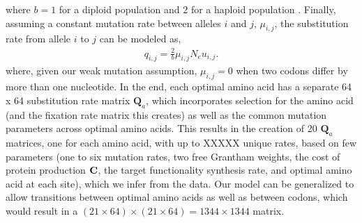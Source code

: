 \documentclass{article}
\newcommand{\Cost}{\ensuremath{\text{\textbf{C}}}\xspace}
\newcommand{\Ne}{\ensuremath{{N_e}}\xspace} %
\newcommand{\Qmatrix}{\mathbf{Q}\xspace}
\newcommand{\Qmatrixa}{\ensuremath{\Qmatrix_a}\xspace}
\newcommand{\muij}{\ensuremath{\mu_{i,j}}\xspace}
\begin{document}
where $b=1$ for a diploid population and $2$ for a haploid population \citep{Kimura1962,Wright1969,Iwasa1988,BergAndLassig2003,SellaAndHirsh2005}.
Finally, assuming a constant mutation rate between alleles $i$ and $j$, $\muij$, the substitution rate from allele $i$ to $j$ can be modeled as,
\begin{align*}
  q_{i,j} = \frac{2}{b} \muij \Ne u_{i,j}.
\end{align*}
where, given our weak mutation assumption, $\muij = 0$ when two codons differ by more than one nucleotide.
In the end, each optimal amino acid has a separate 64 x 64 substitution rate matrix \Qmatrixa, which incorporates selection for the amino acid (and the fixation rate matrix this creates) as well as the common mutation parameters across optimal amino acids. 
This results in the creation of 20  \Qmatrixa  matrices, one for each amino acid, with up to XXXXX unique rates, based on few parameters (one to six mutation rates, two free Grantham weights, the cost of protein production \Cost, the target functionality synthesis rate, and optimal amino acid at each site), which we infer from the data.
Our model can be generalized to allow  transitions between optimal amino acids as well as between codons, which would result in a $(21 \times 64) \times (21 \times 64) =  1344 \times 1344$ matrix. 
\end{document}
